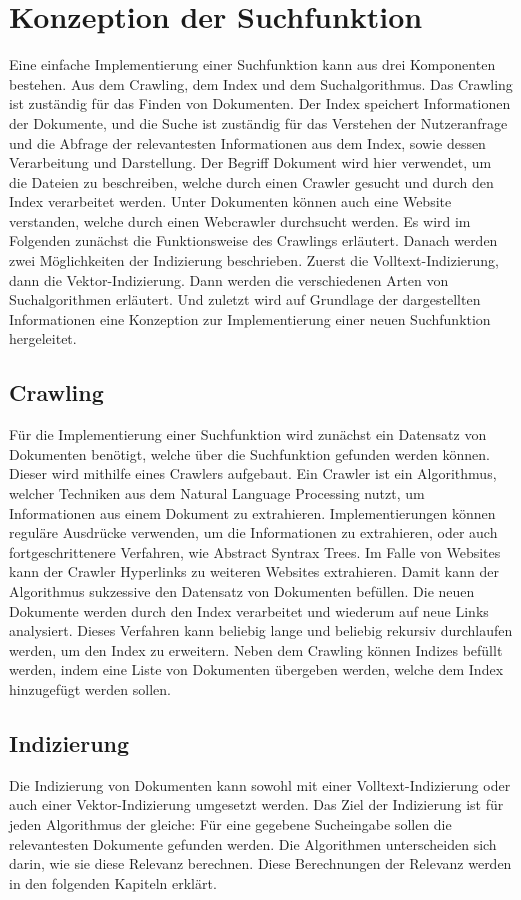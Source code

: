 \chapter{Konzeption der Suchfunktion}
Eine einfache Implementierung einer Suchfunktion kann aus drei Komponenten bestehen.
Aus dem Crawling, dem Index und dem Suchalgorithmus.
Das Crawling ist zuständig für das Finden von Dokumenten\cite{Castillo_2005}.
Der Index speichert Informationen der Dokumente, und die Suche ist zuständig für das Verstehen der Nutzeranfrage und die Abfrage der relevantesten Informationen aus dem Index, sowie dessen Verarbeitung und Darstellung.
Der Begriff Dokument wird hier verwendet, um die Dateien zu beschreiben, welche durch einen Crawler gesucht und durch den Index verarbeitet werden.
Unter Dokumenten können auch eine Website verstanden, welche durch einen Webcrawler durchsucht werden.
Es wird im Folgenden zunächst die Funktionsweise des Crawlings erläutert.
Danach werden zwei Möglichkeiten der Indizierung beschrieben.
Zuerst die Volltext-Indizierung, dann die Vektor-Indizierung.
Dann werden die verschiedenen Arten von Suchalgorithmen erläutert.
Und zuletzt wird auf Grundlage der dargestellten Informationen eine Konzeption zur Implementierung einer neuen Suchfunktion hergeleitet.

\section{Crawling}
Für die Implementierung einer Suchfunktion wird zunächst ein Datensatz von Dokumenten benötigt, welche über die Suchfunktion gefunden werden können.
Dieser wird mithilfe eines Crawlers aufgebaut.
Ein Crawler ist ein Algorithmus, welcher Techniken aus dem Natural Language Processing nutzt, um Informationen aus einem Dokument zu extrahieren.\cite{Khder_2021}
Implementierungen können reguläre Ausdrücke verwenden, um die Informationen zu extrahieren, oder auch fortgeschrittenere Verfahren, wie Abstract Syntrax Trees.
Im Falle von Websites kann der Crawler Hyperlinks zu weiteren Websites extrahieren.
Damit kann der Algorithmus sukzessive den Datensatz von Dokumenten befüllen.
Die neuen Dokumente werden durch den Index verarbeitet und wiederum auf neue Links analysiert.
Dieses Verfahren kann beliebig lange und beliebig rekursiv durchlaufen werden, um den Index zu erweitern.
Neben dem Crawling können Indizes befüllt werden, indem eine Liste von Dokumenten übergeben werden, welche dem Index hinzugefügt werden sollen.

\section{Indizierung}
Die Indizierung von Dokumenten kann sowohl mit einer Volltext-Indizierung oder auch einer Vektor-Indizierung umgesetzt werden.
Das Ziel der Indizierung ist für jeden Algorithmus der gleiche: Für eine gegebene Sucheingabe sollen die relevantesten Dokumente gefunden werden.
Die Algorithmen unterscheiden sich darin, wie sie diese Relevanz berechnen.
Diese Berechnungen der Relevanz werden in den folgenden Kapiteln erklärt.

